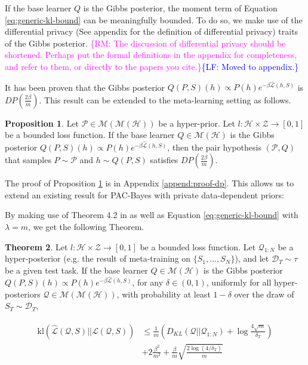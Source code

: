 \documentclass[letterpaper]{article} %
\theoremstyle{definition}
\newtheorem{theorem}{Theorem}[section]
\newtheorem{proposition}[theorem]{Proposition}
\newcommand{\RM}[1]{\textcolor{magenta}{\{RM: #1\}}}
\newcommand{\LF}[1]{\textcolor{blue}{\{LF: #1\}}}
\begin{document}
If the base learner $Q$ is the Gibbs posterior, the moment term of Equation \ref{eq:generic-kl-bound} can be meaningfully bounded. To do so, we make use of the differential privacy (See appendix for the definition of differential privacy) traits of the Gibbs posterior.
\RM{The discussion of differential privacy should be shortened. Perhaps put the formal definitions in the appendix for completeness, and refer to them, or directly to the papers you cite.}\LF{Moved to appendix.}

It has been proven \citep{McSherry2007, Rivasplata2020} that the Gibbs posterior $Q(P, S)(h)\propto P(h)e^{-\beta\hat{\mathcal{L}}(h, S)}$ is $DP\left (\frac{2\beta}{m}\right )$.
This result can be extended to the meta-learning setting as follows. 
%
\begin{proposition} \label{thm:pair-is-dp}
	Let $\mathcal{P}\in \mathcal{M}(\mathcal{M}(\mathcal{H}))$ be a hyper-prior.
	Let $l:\mathcal{H}\times \mathcal{Z}\rightarrow [0,1]$ be a bounded loss function. If the base learner $Q\in \mathcal{M}(\mathcal{H})$ is the Gibbs posterior $Q(P, S)(h)\propto P(h)e^{-\beta\hat{\mathcal{L}}(h, S)}$, 
	then the pair hypothesis $(\mathcal{P}, Q)$ that samples $P\sim\mathcal{P}$ and $h\sim Q(P, S)$ satisfies $DP\left (\frac{2\beta}{m}\right )$.
\end{proposition}

The proof of Proposition \ref{thm:pair-is-dp} is in Appendix \ref{append:proof-dp}. This  allows us to extend an existing result for PAC-Bayes with private data-dependent priors:

By making use of Theorem 4.2 in \citet{Dziugaite2018} as well as Equation \ref{eq:generic-kl-bound} with $\lambda=m$, we get the following Theorem.

\begin{theorem} \label{thm:kl-main-result}
	Let $l:\mathcal{H}\times \mathcal{Z}\rightarrow [0,1]$ be a bounded loss function.
	Let $\mathcal{Q}_{1:N}$ be a hyper-posterior (e.g. the result of meta-training on $\{S_1,...,S_N\}$), and let $\mathcal{D}_T\sim \tau$ be a given test task. 
	If the base learner $Q\in \mathcal{M}(\mathcal{H})$ is the Gibbs posterior $Q(P, S)(h)\propto P(h)e^{-\beta\hat{\mathcal{L}}(h, S)}$, 
	for any $\delta\in(0,1)$, uniformly for all hyper-posteriors $\mathcal{Q}\in \mathcal{M}(\mathcal{M}(\mathcal{H}))$, with probability at least $1-\delta$ over the draw of $S_T\sim \mathcal{D}_T$,
	
	\begin{align*} 
	\begin{split}
	\mathrm{kl}(\hat{\mathcal{L}}(\mathcal{Q},S)||\mathcal{L}(\mathcal{Q},S))&\leq \frac{1}{m}\left (D_{KL}(\mathcal{Q}||\mathcal{Q}_{1:N})+\log\frac{4\sqrt{m}}{\delta_T} \right )\\
	& +2\frac{\beta^2}{m^2}+\frac{\beta}{m}\sqrt{\frac{2\log (4/\delta_T)}{m}}
	\end{split}
	\end{align*}
	
\end{theorem}
\end{document}
